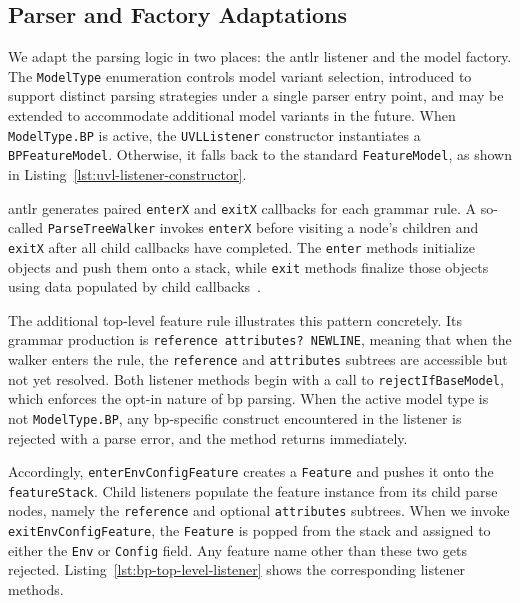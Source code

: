 \subsection{Parser and Factory Adaptations}
\label{subsec:impl_uvl_metamodel_parser}

We adapt the parsing logic in two places: the \gls{antlr} listener and the model factory.
The \texttt{ModelType} enumeration controls model variant selection, introduced to support distinct parsing strategies under a single parser entry point, and may be extended to accommodate additional model variants in the future.
When \texttt{ModelType.BP} is active, the \texttt{UVLListener} constructor instantiates a \texttt{BPFeatureModel}.
Otherwise, it falls back to the standard \texttt{FeatureModel}, as shown in Listing~\ref{lst:uvl-listener-constructor}.



\gls{antlr} generates paired \texttt{enterX} and \texttt{exitX} callbacks for each grammar rule.
A so-called \texttt{ParseTreeWalker} invokes \texttt{enterX} before visiting a node's children and \texttt{exitX} after all child callbacks have completed.
The \texttt{enter} methods initialize objects and push them onto a stack, while \texttt{exit} methods finalize those objects using data populated by child callbacks~\cite{parr_definitive_2013}.

The additional top-level feature rule illustrates this pattern concretely.
Its grammar production is \texttt{reference attributes? NEWLINE}, meaning that when the walker enters the rule, the \texttt{reference} and \texttt{attributes} subtrees are accessible but not yet resolved.
Both listener methods begin with a call to \texttt{rejectIfBaseModel}, which enforces the opt-in nature of \gls{bp} parsing.
When the active model type is not \texttt{ModelType.BP}, any \gls{bp}-specific construct encountered in the listener is rejected with a parse error, and the method returns immediately.

Accordingly, \texttt{enterEnvConfigFeature} creates a \texttt{Feature} and pushes it onto the \texttt{featureStack}.
Child listeners populate the feature instance from its child parse nodes, namely the \texttt{reference} and optional \texttt{attributes} subtrees.
When we invoke \texttt{exitEnvConfigFeature}, the \texttt{Feature} is popped from the stack and assigned to either the \texttt{Env} or \texttt{Config} field.
Any feature name other than these two gets rejected.
Listing~\ref{lst:bp-top-level-listener} shows the corresponding listener methods.

